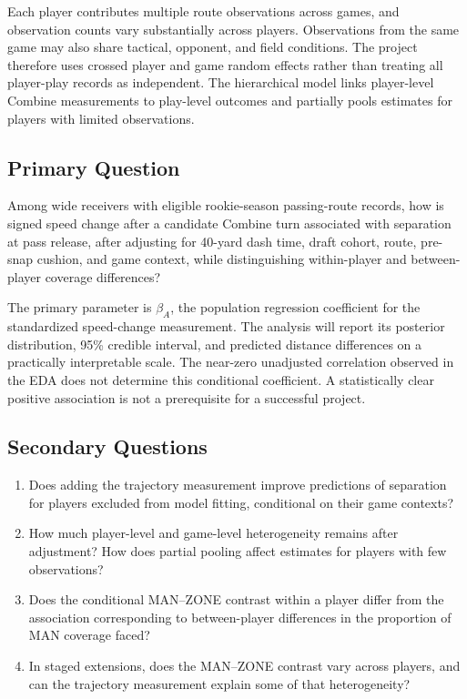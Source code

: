 \documentclass[a4paper,11pt]{article}
\begin{document}
Each player contributes multiple route observations across games, and observation counts vary substantially across players. Observations from the same game may also share tactical, opponent, and field conditions. The project therefore uses crossed player and game random effects rather than treating all player-play records as independent. The hierarchical model links player-level Combine measurements to play-level outcomes and partially pools estimates for players with limited observations.\cite{gelman}

\subsection{Primary Question}

Among wide receivers with eligible rookie-season passing-route records, how is signed speed change after a candidate Combine turn associated with separation at pass release, after adjusting for 40-yard dash time, draft cohort, route, pre-snap cushion, and game context, while distinguishing within-player and between-player coverage differences?

The primary parameter is $\beta_A$, the population regression coefficient for the standardized speed-change measurement. The analysis will report its posterior distribution, 95\% credible interval, and predicted distance differences on a practically interpretable scale. The near-zero unadjusted correlation observed in the EDA does not determine this conditional coefficient. A statistically clear positive association is not a prerequisite for a successful project.

\subsection{Secondary Questions}

\begin{enumerate}
\item Does adding the trajectory measurement improve predictions of separation for players excluded from model fitting, conditional on their game contexts?
\item How much player-level and game-level heterogeneity remains after adjustment? How does partial pooling affect estimates for players with few observations?
\item Does the conditional MAN--ZONE contrast within a player differ from the association corresponding to between-player differences in the proportion of MAN coverage faced?
\item In staged extensions, does the MAN--ZONE contrast vary across players, and can the trajectory measurement explain some of that heterogeneity?
\end{enumerate}
\end{document}
